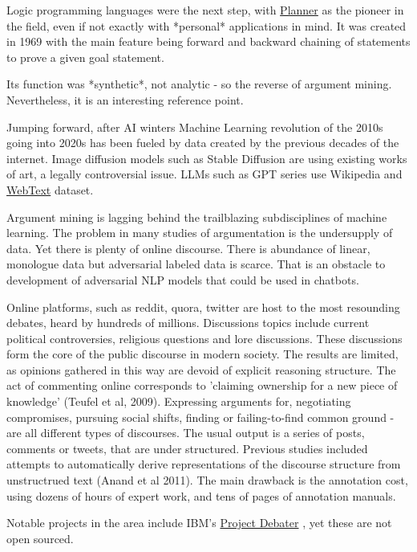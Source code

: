 \documentclass{report}
\begin{document}
Logic programming languages were the next step, with \href{https://en.wikipedia.org/wiki/Planner_(programming_language)}{Planner} as the pioneer in the field, even if not exactly with *personal* applications in mind.  It was created in 1969 with the main feature being forward and backward chaining of statements to prove a given goal statement.
\cite{hewitt_planner_1970}

Its function was *synthetic*, not analytic - so the reverse of argument mining. Nevertheless, it is an interesting reference point.

Jumping forward, after AI winters Machine Learning revolution of the 2010s going into 2020s has been fueled by data created by the previous decades of the internet. Image diffusion models such as Stable Diffusion are using existing works of art, a legally controversial issue. LLMs such as GPT series use Wikipedia and \href{https://paperswithcode.com/dataset/webtext}{WebText} dataset.
\cite{rombach_high-resolution_2022}

Argument mining is lagging behind the trailblazing subdisciplines of machine learning. The problem in many studies of argumentation is the undersupply of data. Yet there is plenty of online discourse.
There is abundance of linear, monologue data but adversarial labeled data is scarce. That is an obstacle to development of adversarial NLP models that could be used in chatbots. 

Online platforms, such as reddit, quora, twitter are host to the most resounding debates, heard by hundreds of millions.  Discussions topics include current political controversies, religious questions and lore discussions. These discussions form the core of the public discourse in modern society.  The results are limited, as opinions gathered in this way are devoid of explicit reasoning structure.  The act of commenting online corresponds to 'claiming ownership for a new piece of knowledge' (Teufel et al, 2009). Expressing arguments for, negotiating compromises, pursuing social shifts, finding or failing-to-find common ground - are all different types of discourses. The usual output is a series of posts, comments or tweets, that are under structured. 
Previous studies included attempts to automatically derive representations of the discourse structure from unstructrued text (Anand et al 2011).
The main drawback is the annotation cost, using dozens of hours of expert work, and tens of pages of annotation manuals.

Notable projects in the area include IBM's \href{https://research.ibm.com/interactive/project-debater/}{Project Debater} \cite{slonim2021autonomous}, yet these are not open sourced.
\end{document}
